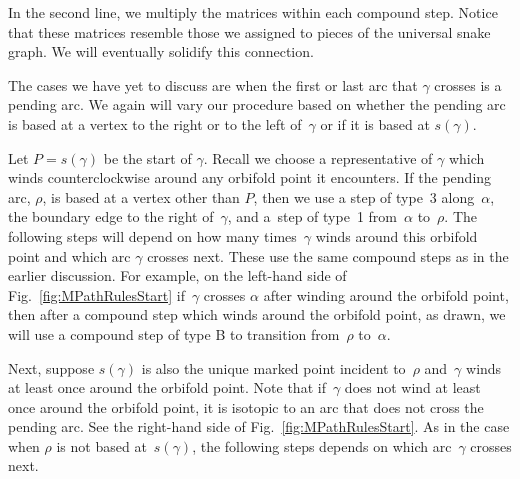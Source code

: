 \begin{Example}
In the second line, we multiply the matrices within each compound step. Notice that these matrices resemble those we assigned to pieces of the universal snake graph. We will eventually solidify this connection.
\end{Example}

The cases we have yet to discuss are when the first or last arc that $\gamma$ crosses is a pending arc. We again will vary our procedure based on whether the pending arc is based at a vertex to the right or to the left of~$\gamma$ or if it is based at $s(\gamma)$.

Let $P = s(\gamma)$ be the start of $\gamma$. Recall we choose a representative of $\gamma$ which winds counterclockwise around any orbifold point it encounters. If the pending arc, $\rho$, is based at a vertex other than $P$, then we use a step of type~3 along~$\alpha$, the boundary edge to the right of~$\gamma$, and a~step of type~1 from~$\alpha$ to~$\rho$.
The following steps will depend on how many times~$\gamma$ winds around this orbifold point and which arc $\gamma$ crosses next. These use the same compound steps as in the earlier discussion. For example, on the left-hand side of Fig.~\ref{fig:MPathRulesStart} if~$\gamma$ crosses $\alpha$ after winding around the orbifold point, then after a compound step which winds around the orbifold point, as drawn, we will use a compound step of type B to transition from~$\rho$ to~$\alpha$.

Next, suppose $s(\gamma)$ is also the unique marked point incident to~$\rho$ and~$\gamma$ winds at least once around the orbifold point. Note that if~$\gamma$ does not wind at least once around the orbifold point, it is isotopic to an arc that does not cross the pending arc. See the right-hand side of Fig.~\ref{fig:MPathRulesStart}.
As in the case when $\rho$ is not based at~$s(\gamma)$, the following steps depends on which arc~$\gamma$ crosses next.

